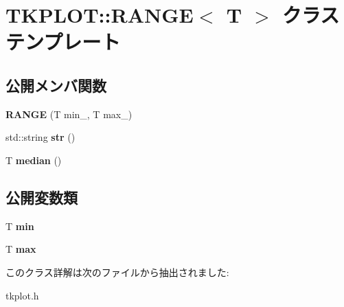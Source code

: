 \hypertarget{class_t_k_p_l_o_t_1_1_r_a_n_g_e}{}\section{T\+K\+P\+L\+OT\+:\+:R\+A\+N\+GE$<$ T $>$ クラステンプレート}
\label{class_t_k_p_l_o_t_1_1_r_a_n_g_e}
\subsection*{公開メンバ関数}
\begin{DoxyCompactItemize}
\item 
\mbox{\label{class_t_k_p_l_o_t_1_1_r_a_n_g_e_a15cccdb1c926b077c9f06173a5d144a5}} 
{\bfseries R\+A\+N\+GE} (T min\+\_\+, T max\+\_\+)
\item 
\mbox{\label{class_t_k_p_l_o_t_1_1_r_a_n_g_e_aada3563138773d6575a67eed99dc8c1b}} 
std\+::string {\bfseries str} ()
\item 
\mbox{\label{class_t_k_p_l_o_t_1_1_r_a_n_g_e_ace282f2a0952d3cca69702556ef92836}} 
T {\bfseries median} ()
\end{DoxyCompactItemize}
\subsection*{公開変数類}
\begin{DoxyCompactItemize}
\item 
\mbox{\label{class_t_k_p_l_o_t_1_1_r_a_n_g_e_af83dec2420b2e2d8629d212475a49fee}} 
T {\bfseries min}
\item 
\mbox{\label{class_t_k_p_l_o_t_1_1_r_a_n_g_e_a7100fa300f2cffeed4e5f0657afea787}} 
T {\bfseries max}
\end{DoxyCompactItemize}


このクラス詳解は次のファイルから抽出されました\+:\begin{DoxyCompactItemize}
\item 
tkplot.\+h\end{DoxyCompactItemize}
